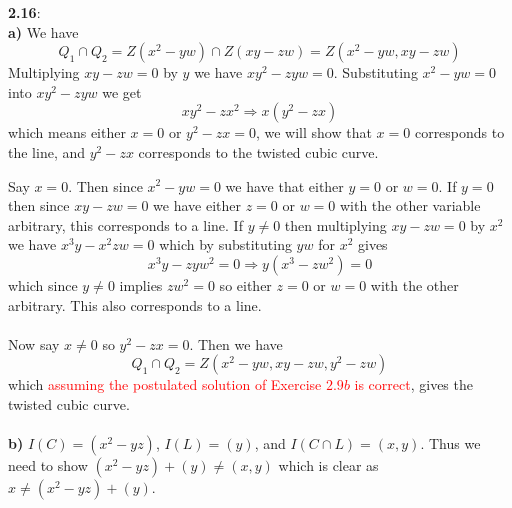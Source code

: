 \documentclass[12pt]{article}
\numberwithin{thm}{subsection}
\numberwithin{defn}{subsection}
\numberwithin{lemma}{subsection}
\numberwithin{example}{subsection}
\numberwithin{notation}{subsection}
\numberwithin{cor}{subsection}
\numberwithin{remark}{subsection}
\numberwithin{condition}{subsection}
\numberwithin{question}{subsection}
\numberwithin{construction}{subsection}
\numberwithin{construction}{subsection}
\numberwithin{construction}{subsection}
\begin{document}
%
\textbf{2.16}:\\
%
\textbf{a)} We have
\[Q_1 \cap Q_2 = Z(x^2 - yw) \cap Z(xy -zw) = Z(x^2 - yw, xy - zw)\]
Multiplying $xy - zw = 0$ by $y$ we have $xy^2 - zyw = 0$. Substituting $x^2 - yw = 0$ into $xy^2 - zyw$ we get
\[xy^2 - zx^2 \Longrightarrow x(y^2 - zx)\]
which means either $x = 0$ or $y^2 - zx = 0$, we will show that $x = 0$ corresponds to the line, and $y^2 - zx$ corresponds to the twisted cubic curve.

Say $x = 0$. Then since $x^2 - yw = 0$ we have that either $y = 0$ or $w = 0$. If $y = 0$ then since $xy - zw = 0$ we have either $z = 0$ or $w = 0$ with the other variable arbitrary, this corresponds to a line. If $y \neq 0$ then multiplying $xy - zw = 0$ by $x^2$ we have $x^3y - x^2zw = 0$ which by substituting $yw$ for $x^2$ gives
\[x^3y - zyw^2 = 0 \Longrightarrow y(x^3 - zw^2) = 0\]
which since $y \neq 0$ implies $zw^2 = 0$ so either $z = 0$ or $w = 0$ with the other arbitrary. This also corresponds to a line.\\\\
%
Now say $x \neq 0$ so $y^2 - zx = 0$. Then we have
\[Q_1 \cap Q_2 = Z(x^2 - yw, xy - zw, y^2 - zw)\]
which \textcolor{red}{assuming the postulated solution of Exercise $2.9b$ is correct}, gives the twisted cubic curve.\\\\
%
\textbf{b)} $I(C) = (x^2 - yz)$, $I(L) = (y)$, and $I(C \cap L) = (x,y)$. Thus we need to show $(x^2 - yz) + (y) \neq (x,y)$ which is clear as $x \neq (x^2 - yz) + (y)$.
\end{document}
